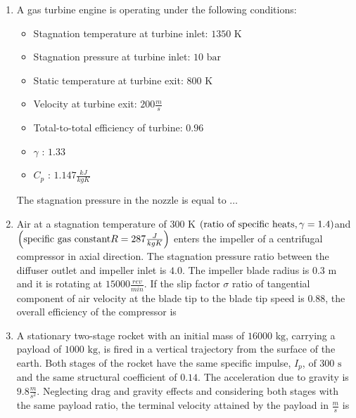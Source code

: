 \documentclass[journal,12pt,twocolumn]{IEEEtran}
\theoremstyle{remark}
\begin{document}
\begin{enumerate}[start=40]
    \item A gas turbine engine is operating under the following conditions:
    \begin{itemize}
        \item Stagnation temperature at turbine inlet: $1350 \text{ K}$
        \item Stagnation pressure at turbine inlet: $10 \text{ bar}$
        \item Static temperature at turbine exit: $800 \text{ K}$
        \item Velocity at turbine exit: $200  \frac{m}{s}$
        \item Total-to-total efficiency of turbine: $0.96$
        \item $\gamma$ : $1.33$
        \item $C_p$ : $1.147 \frac{ kJ}{kg K}$
    \end{itemize}
    
    The stagnation pressure  in the nozzle  is equal to $\dots$

    \item Air at a stagnation temperature of $300 \text{ K}$ $\left(\text{ratio of specific heats}, \gamma = 1.4 \right)$and $\left(\text{specific gas constant} R = 287 \frac {J}{kg K}\right)$ enters the impeller of a centrifugal compressor in axial direction. The stagnation pressure ratio between the diffuser outlet and impeller inlet is $4.0$. The impeller blade radius is $0.3 \text{ m}$ and it is rotating at $15000 \frac{ rev}{min}$. If the slip factor $\sigma$ ratio of tangential component of air velocity   at the blade tip to the blade tip speed is $0.88$, the overall efficiency  of the compressor  is

    \item A stationary two-stage rocket with an initial mass of $16000 \text{ kg}$, carrying a payload of $1000 \text{ kg}$, is fired in a vertical trajectory from the surface of the earth. Both stages of the rocket have the same specific impulse, $I_p$, of $300 \text{ s}$ and the same structural coefficient of $0.14$. The acceleration due to gravity is $9.8\frac{ m}{s^2}$. Neglecting drag and gravity effects and considering both stages with the same payload ratio, the terminal velocity attained by the payload in $\frac{m}{s}$ is


\end{enumerate}
\end{document}
